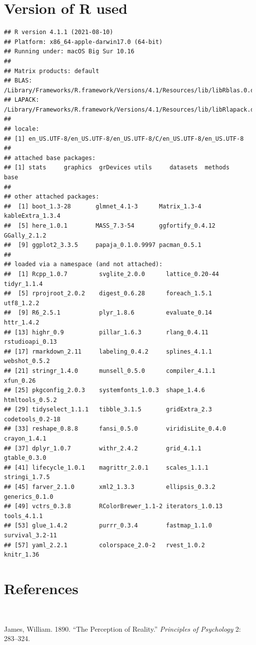 \documentclass[
  11pt,
]{article}
\newlength{\cslhangindent}
\newlength{\cslentryspacingunit} %
\newenvironment{CSLReferences}[2] %
 {%
  \setlength{\parindent}{0pt}
  \ifodd #1
  \let\oldpar\par
  \def\par{\hangindent=\cslhangindent\oldpar}
  \fi
  \setlength{\parskip}{#2\cslentryspacingunit}
 }%
 {}
\begin{document}
\hypertarget{version-of-r-used}{%
\section{Version of R used}\label{version-of-r-used}}

\begin{verbatim}
## R version 4.1.1 (2021-08-10)
## Platform: x86_64-apple-darwin17.0 (64-bit)
## Running under: macOS Big Sur 10.16
## 
## Matrix products: default
## BLAS:   /Library/Frameworks/R.framework/Versions/4.1/Resources/lib/libRblas.0.dylib
## LAPACK: /Library/Frameworks/R.framework/Versions/4.1/Resources/lib/libRlapack.dylib
## 
## locale:
## [1] en_US.UTF-8/en_US.UTF-8/en_US.UTF-8/C/en_US.UTF-8/en_US.UTF-8
## 
## attached base packages:
## [1] stats     graphics  grDevices utils     datasets  methods   base     
## 
## other attached packages:
##  [1] boot_1.3-28       glmnet_4.1-3      Matrix_1.3-4      kableExtra_1.3.4 
##  [5] here_1.0.1        MASS_7.3-54       ggfortify_0.4.12  GGally_2.1.2     
##  [9] ggplot2_3.3.5     papaja_0.1.0.9997 pacman_0.5.1     
## 
## loaded via a namespace (and not attached):
##  [1] Rcpp_1.0.7         svglite_2.0.0      lattice_0.20-44    tidyr_1.1.4       
##  [5] rprojroot_2.0.2    digest_0.6.28      foreach_1.5.1      utf8_1.2.2        
##  [9] R6_2.5.1           plyr_1.8.6         evaluate_0.14      httr_1.4.2        
## [13] highr_0.9          pillar_1.6.3       rlang_0.4.11       rstudioapi_0.13   
## [17] rmarkdown_2.11     labeling_0.4.2     splines_4.1.1      webshot_0.5.2     
## [21] stringr_1.4.0      munsell_0.5.0      compiler_4.1.1     xfun_0.26         
## [25] pkgconfig_2.0.3    systemfonts_1.0.3  shape_1.4.6        htmltools_0.5.2   
## [29] tidyselect_1.1.1   tibble_3.1.5       gridExtra_2.3      codetools_0.2-18  
## [33] reshape_0.8.8      fansi_0.5.0        viridisLite_0.4.0  crayon_1.4.1      
## [37] dplyr_1.0.7        withr_2.4.2        grid_4.1.1         gtable_0.3.0      
## [41] lifecycle_1.0.1    magrittr_2.0.1     scales_1.1.1       stringi_1.7.5     
## [45] farver_2.1.0       xml2_1.3.3         ellipsis_0.3.2     generics_0.1.0    
## [49] vctrs_0.3.8        RColorBrewer_1.1-2 iterators_1.0.13   tools_4.1.1       
## [53] glue_1.4.2         purrr_0.3.4        fastmap_1.1.0      survival_3.2-11   
## [57] yaml_2.2.1         colorspace_2.0-2   rvest_1.0.2        knitr_1.36
\end{verbatim}

\hypertarget{references-1}{%
\section{References}\label{references-1}}

\(~\) \(~\)

\hypertarget{refs}{}
\begin{CSLReferences}{1}{0}
\leavevmode{}%
James, William. 1890. {``The Perception of Reality.''} \emph{Principles
of Psychology} 2: 283--324.

\end{CSLReferences}
\end{document}
